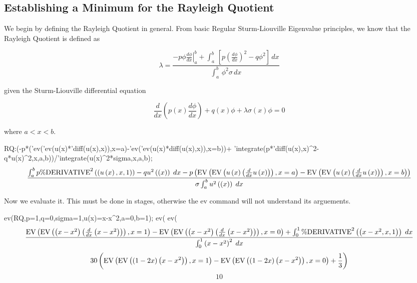 
\subsection*{Establishing a Minimum for the Rayleigh Quotient}

We begin by defining the Rayleigh Quotient in general.  From basic
Regular Sturm-Liouville Eigenvalue principles, we know that the 
Rayleigh Quotient is defined as

\[\lambda =\frac{-p\phi \left. \frac{d\phi }{dx}\right| ^{b}_{a}+\int _{a}^{b}\, \left[p \left( \frac{d\phi }{dx}\right)^{2}-q\phi ^{2}\right] \, dx}{\int _{a}^{b}\, \phi ^{2}\sigma \, dx}\]


given the Sturm-Liouville differential equation

\[\frac{d}{dx}\left( p\left( x\right) \frac{d\phi }{dx}\right) +q\left( x\right) \phi +\lambda \sigma \left( x\right) \phi =0\]


where $a<x<b$.

\beginmaxima
RQ:(-p*('ev('ev(u(x)*'diff(u(x),x)),x=a)-'ev('ev(u(x)*diff(u(x),x)),x=b))+
'integrate(p*'diff(u(x),x)^2-q*u(x)^2,x,a,b))/'integrate(u(x)^2*sigma,x,a,b);
\maximatexoutput
{\small$$  {{\int_{a}^{b}{p\*\mathrm{\%DERIVATIVE}^{2}\left(\left(u\left(x
 \right),\linebreak[0]x,\linebreak[0]1\right)\right)-q\*u^{2}\left(
 \left(x\right)\right)\;dx}-p\*\left(\mathrm{EV}\left(\mathrm{EV}
 \left(u\left(x\right)\*\left({{d}\over{d\*x}}\*u\left(x\right)
 \right)\right),\linebreak[0]x=a\right)-\mathrm{EV}\left(\mathrm{EV}
 \left(u\left(x\right)\*\left({{d}\over{d\*x}}\*u\left(x\right)
 \right)\right),\linebreak[0]x=b\right)\right)}\over{\sigma\*\int_{a
 }^{b}{u^{2}\left(\left(x\right)\right)\;dx}}} $$
}
\endmaxima

Now we evaluate it.  This must be done in stages, otherwise the ev command
will not understand its arguements.

\beginmaxima
ev(RQ,p=1,q=0,sigma=1,u(x)=x-x^2,a=0,b=1);
ev(%
ev(%
\maximatexoutput
{\small$$   {{\mathrm{EV}\left(\mathrm{EV}\left(\left(x-x^{2}\right)\*\left(
 {{d}\over{d\*x}}\*\left(x-x^{2}\right)\right)\right),\linebreak[0]x=
 1\right)-\mathrm{EV}\left(\mathrm{EV}\left(\left(x-x^{2}\right)\*
 \left({{d}\over{d\*x}}\*\left(x-x^{2}\right)\right)\right)
 ,\linebreak[0]x=0\right)+\int_{0}^{1}{\mathrm{\%DERIVATIVE}^{2}
 \left(\left(x-x^{2},\linebreak[0]x,\linebreak[0]1\right)\right)\;dx}
 }\over{\int_{0}^{1}{\left(x-x^{2}\right)^{2}\;dx}}} $$
}
$$   30\*\left(\mathrm{EV}\left(\mathrm{EV}\left(\left(1-2\*x\right)
 \*\left(x-x^{2}\right)\right),\linebreak[0]x=1\right)-\mathrm{EV}
 \left(\mathrm{EV}\left(\left(1-2\*x\right)\*\left(x-x^{2}\right)
 \right),\linebreak[0]x=0\right)+{{1}\over{3}}\right) $$
$$   10 $$
\endmaxima

